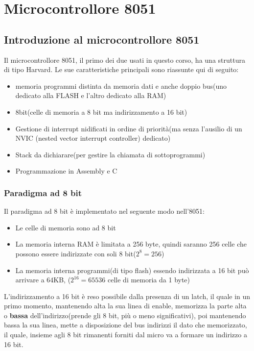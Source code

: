 \documentclass[main.tex]{subfiles}
\begin{document}
\chapter{Microcontrollore 8051}

\section{Introduzione al microcontrollore 8051}
Il microcontrollore 8051, il primo dei due usati in questo corso, ha una struttura di tipo Harvard. Le sue caratteristiche principali sono riassunte qui di seguito:
\begin{itemize}
    \item memoria programmi distinta da memoria dati e anche doppio bus(uno dedicato alla FLASH e l'altro dedicato alla RAM)
    \item 8bit(celle di memoria a 8 bit ma indirizzamento a 16 bit)
    \item Gestione di interrupt nidificati in ordine di priorità(ma senza l'ausilio di un NVIC (nested vector interrupt controller) dedicato)
    \item Stack da dichiarare(per gestire la chiamata di sottoprogrammi)
    \item Programmazione in Assembly e C 
\end{itemize}

\subsection{Paradigma ad 8 bit}
Il paradigma ad 8 bit è implementato nel seguente modo nell'8051:
\begin{itemize}
    \item Le celle di memoria sono ad 8 bit
    \item La memoria interna RAM è limitata a 256 byte, quindi saranno 256 celle che possono essere indirizzate con soli 8 bit($2^8=256$)
    \item La memoria interna programmi(di tipo flash) essendo indirizzata a 16 bit può arrivare a 64KB, ($2^{16}=65536$ celle di memoria da 1 byte)
\end{itemize}
L'indirizzamento a 16 bit è reso possibile dalla presenza di un latch, il quale in un primo momento, mantenendo alta la sua linea di enable, memorizza la parte alta o \textbf{bassa} dell'indirizzo(prende gli 8 bit, più o meno significativi), poi mantenendo bassa la sua linea, mette a disposizione del bus indirizzi il dato che memorizzato, il quale, insieme agli 8 bit rimanenti forniti dal micro va a formare un indirizzo a 16 bit.
\end{document}
